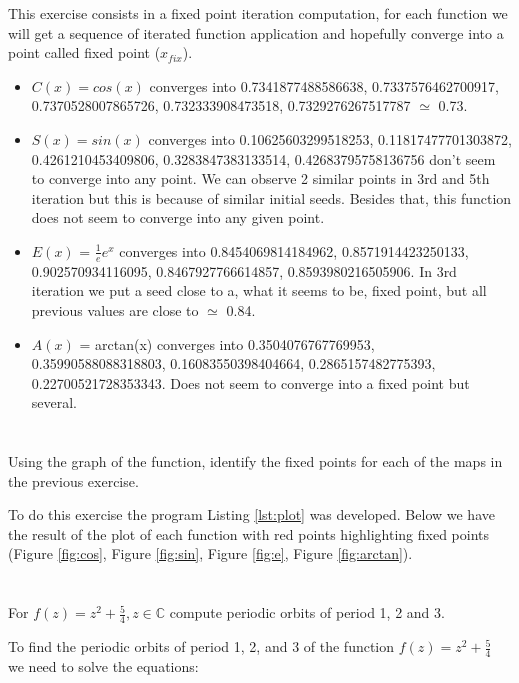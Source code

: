 \documentclass[11pt]{article}
\begin{document}
This exercise consists in a fixed point iteration computation, for each function we will get a sequence of iterated function application and hopefully converge into a point called fixed point ($x_{fix}$).

\begin{itemize}
    \item $C(x) = cos(x)$ converges into 0.7341877488586638, 0.7337576462700917, 0.7370528007865726, 0.732333908473518, 0.7329276267517787 $\simeq$ 0.73.  
    \item $S(x) = sin(x)$ converges into 0.10625603299518253, 0.11817477701303872, 0.4261210453409806, 0.3283847383133514, 0.42683795758136756 don't seem to converge into any point. We can observe 2 similar points in 3rd and 5th iteration but this is because of similar initial seeds. Besides that, this function does not seem to converge into any given point.
    \item $E(x)$ = $\frac{1}{e}e^{x}$ converges into 0.8454069814184962, 0.8571914423250133, 0.902570934116095, 0.8467927766614857, 0.8593980216505906. In 3rd iteration we put a seed close to a, what it seems to be, fixed point, but all previous values are close to $\simeq$ 0.84.
    \item $A(x)$ = arctan(x) converges into 0.3504076767769953, 0.35990588088318803, 0.16083550398404664, 0.2865157482775393, 0.22700521728353343. Does not seem to converge into a fixed point but several.
\end{itemize}

\hypertarget{section}{%
\section{}\label{section}} Using the graph of the function, identify the fixed points for each of the maps in
the previous exercise.

To do this exercise the program Listing \ref{lst:plot} was developed. Below we have the result of the plot of each function with red points highlighting fixed points (Figure \ref{fig:cos}, Figure \ref{fig:sin}, Figure \ref{fig:e}, Figure \ref{fig:arctan}).

\hypertarget{3}{%
\section{}\label{3}} For $f(z) = z^{2} + \frac{5}{4}, z ∈ \mathbb{C}$ compute periodic orbits of period 1, 2 and 3.

To find the periodic orbits of period 1, 2, and 3 of the function $f(z) = z^2 + \frac{5}{4}$ we need to solve the equations:
\end{document}
